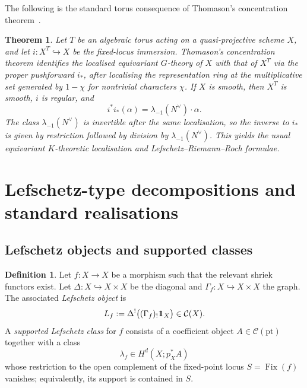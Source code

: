 \documentclass[10pt,a4paper,dvipsnames,x11names]{amsart}
\newcommand{\one}{1\hskip-3.5pt1}
\newcommand{\C}{\mathcal C}
\newcommand{\pt}{\mathrm{pt}}
\providecommand{\Fix}{\operatorname{Fix}}
\numberwithin{equation}{section}
\theoremstyle{plain}
\newtheorem{theorem}{Theorem}[section]
\theoremstyle{definition}
\newtheorem{definition}[definition]{Definition}
\theoremstyle{remark}
\begin{document}
The following is the standard torus consequence of Thomason's concentration theorem~\cite{Thomason}.
\begin{theorem}\label{thm:thomason-localisation}
Let $T$ be an algebraic torus acting on a quasi-projective scheme $X$, and let $i:X^T\hookrightarrow X$ be the fixed-locus immersion.  Thomason's concentration theorem identifies the localised equivariant $G$-theory of $X$ with that of $X^T$ via the proper pushforward $i_*$, after localising the representation ring at the multiplicative set generated by $1-\chi$ for nontrivial characters $\chi$.  If $X$ is smooth, then $X^T$ is smooth, $i$ is regular, and
\[
i^*i_*(\alpha)=\lambda_{-1}(N^\vee)\cdot\alpha.
\]
The class $\lambda_{-1}(N^\vee)$ is invertible after the same localisation, so the inverse to $i_*$ is given by restriction followed by division by $\lambda_{-1}(N^\vee)$.  This yields the usual equivariant $K$-theoretic localisation and Lefschetz--Riemann--Roch formulae.
\end{theorem}


\section{Lefschetz-type decompositions and standard realisations}\label{sec:lefschetz}

\subsection{Lefschetz objects and supported classes}

\begin{definition} \label{def:Lef}
Let $f:X\to X$ be a morphism such that the relevant shriek functors exist. Let $\Delta:X\hookrightarrow X\times X$ be the diagonal and $\Gamma_f:X\hookrightarrow X\times X$ the graph. The associated \emph{Lefschetz object} is
\begin{equation*}
L_f:=\Delta^!\big((\Gamma_f)_!\one_X\big)\in \C(X).
\end{equation*}
A \emph{supported Lefschetz class} for $f$ consists of a coefficient object $A\in\C(\pt)$ together with a class
\begin{equation*}
\lambda_f\in H^d(X;p_X^*A)
\end{equation*}
whose restriction to the open complement of the fixed-point locus $S=\Fix(f)$ vanishes; equivalently, its support is contained in $S$.
\end{definition}
\end{document}
